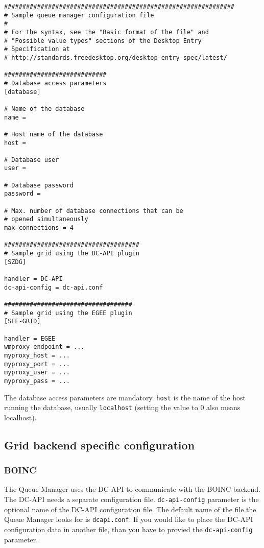 \documentclass[a4paper, 12pt]{article}
\begin{document}
\begin{verbatim}
###############################################################
# Sample queue manager configuration file
#
# For the syntax, see the "Basic format of the file" and 
# "Possible value types" sections of the Desktop Entry 
# Specification at
# http://standards.freedesktop.org/desktop-entry-spec/latest/

############################
# Database access parameters
[database]

# Name of the database
name =

# Host name of the database
host =

# Database user
user =

# Database password
password =

# Max. number of database connections that can be 
# opened simultaneously
max-connections = 4

#####################################
# Sample grid using the DC-API plugin
[SZDG]

handler = DC-API
dc-api-config = dc-api.conf

###################################
# Sample grid using the EGEE plugin
[SEE-GRID]

handler = EGEE
wmproxy-endpoint = ...
myproxy_host = ...
myproxy_port = ...
myproxy_user = ...
myproxy_pass = ...

\end{verbatim}

The database access parameters are mandatory. {\tt host} is the name of the host running the database, usually {\tt localhost} (setting the value to 0 also means localhost). 

\subsection{Grid backend specific configuration}
\subsubsection{BOINC}
\label{subsec:boinc}
The Queue Manager uses the DC-API to communicate with the BOINC backend. The DC-API needs a separate configuration file. {\tt dc-api-config} parameter is the optional name of the DC-API configuration file. The default name of the file the Queue Manager looks for is {\tt dcapi.conf}. If you would like to place the DC-API configuration data in  another file, than you have to provied the {\tt dc-api-config} parameter. 
\end{document}
